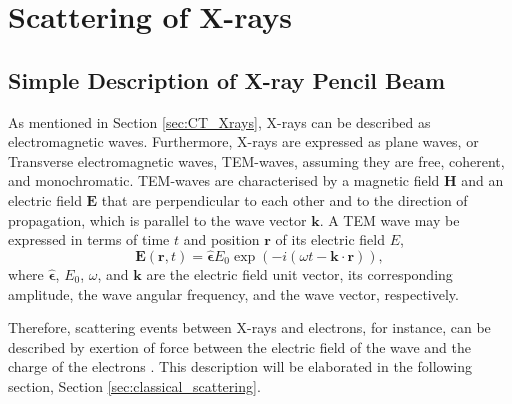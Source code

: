 \chapter{Scattering of X-rays}
\label{ch:scattering}
\section{Simple Description of X-ray Pencil Beam}
As mentioned in Section \ref{sec:CT_Xrays}, X-rays can be described as electromagnetic waves.
Furthermore, X-rays are expressed as plane waves, or Transverse electromagnetic waves, TEM-waves, assuming they are free, coherent, and monochromatic.
TEM-waves are characterised by a magnetic field $\bm{H}$ and an electric field $\bm{E}$ that are perpendicular to each other and to the direction of propagation, which is parallel to the wave vector $\bm{k}$.
A TEM wave may be expressed in terms of time $t$ and position $\bm{r}$ of its electric field $E$,
\begin{equation}\label{eq:TEM_wave}
    \bm{E}(\bm{r},t) = \bm{\widehat{\epsilon}} \left. \right.  E_{0} \exp\left(-i\left(\omega t - \bm{k}\cdot\bm{r}\right)\right),
\end{equation}
where $\bm{\widehat{\epsilon}}$, $E_{0}$, $\omega$, and $\bm{k}$ are the electric field unit vector, its corresponding amplitude, the wave angular frequency, and the wave vector, respectively.

Therefore, scattering events between X-rays and electrons, for instance, can be described by
exertion of force between the electric field of the wave and the charge of the electrons \cite{mcmorrow2011elements}.
This description will be elaborated in the following section, Section \ref{sec:classical_scattering}.


